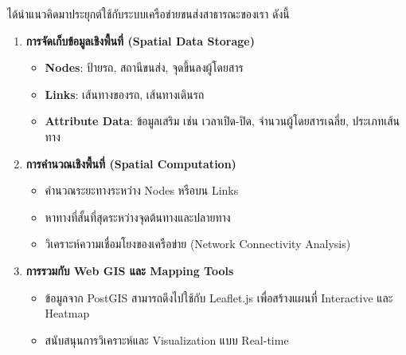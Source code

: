 \indent ได้นำแนวคิดมาประยุกต์ใช้กับระบบเครือข่ายขนส่งสาธารณะของเรา ดังนี้
\begin{enumerate}
    \item \textbf{การจัดเก็บข้อมูลเชิงพื้นที่ (Spatial Data Storage)}
    \begin{itemize}
        \item \textbf{Nodes}: ป้ายรถ, สถานีขนส่ง, จุดขึ้นลงผู้โดยสาร
        \item \textbf{Links}: เส้นทางของรถ, เส้นทางเดินรถ
        \item \textbf{Attribute Data}: ข้อมูลเสริม เช่น เวลาเปิด-ปิด, จำนวนผู้โดยสารเฉลี่ย, ประเภทเส้นทาง
    \end{itemize}

    \item \textbf{การคำนวณเชิงพื้นที่ (Spatial Computation)}
    \begin{itemize}
        \item คำนวณระยะทางระหว่าง Nodes หรือบน Links
        \item หาทางที่สั้นที่สุดระหว่างจุดต้นทางและปลายทาง
        \item วิเคราะห์ความเชื่อมโยงของเครือข่าย (Network Connectivity Analysis)
    \end{itemize}
    \item \textbf{การรวมกับ Web GIS และ Mapping Tools}
    \begin{itemize}
        \item ข้อมูลจาก PostGIS สามารถดึงไปใช้กับ Leaflet.js เพื่อสร้างแผนที่ Interactive และ Heatmap
        \item สนับสนุนการวิเคราะห์และ Visualization แบบ Real-time
    \end{itemize}
\end{enumerate}





